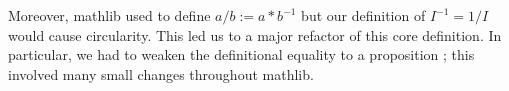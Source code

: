 \documentclass[a4paper,USenglish,cleveref, autoref, thm-restate]{lipics-v2021}
\newcommand{\lean}[1]{\texttt{#1}\xspace} %
\newcommand{\mathlib}{\textsf{mathlib}\xspace}
\begin{document}
Moreover, \mathlib used to define \lean{$a / b := a * b^{-1}$} but our definition of $I^{-1} = 1 / I$ would cause circularity. This led us to a major refactor of this core definition. In particular, we had to weaken the definitional equality to a proposition ; this involved many small changes throughout \mathlib.



%
%
%
%
\end{document}
